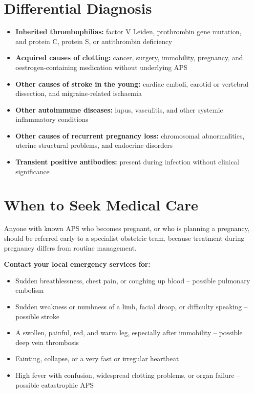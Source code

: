 \section*{Differential Diagnosis}
\begin{itemize}
    \item \textbf{Inherited thrombophilias:} factor V Leiden, prothrombin gene mutation, and protein C, protein S, or antithrombin deficiency
    \item \textbf{Acquired causes of clotting:} cancer, surgery, immobility, pregnancy, and oestrogen-containing medication without underlying APS
    \item \textbf{Other causes of stroke in the young:} cardiac emboli, carotid or vertebral dissection, and migraine-related ischaemia
    \item \textbf{Other autoimmune diseases:} lupus, vasculitis, and other systemic inflammatory conditions
    \item \textbf{Other causes of recurrent pregnancy loss:} chromosomal abnormalities, uterine structural problems, and endocrine disorders
    \item \textbf{Transient positive antibodies:} present during infection without clinical significance
\end{itemize}

\section*{When to Seek Medical Care}
Anyone with known APS who becomes pregnant, or who is planning a pregnancy, should be referred early to a specialist obstetric team, because treatment during pregnancy differs from routine management.

\textbf{Contact your local emergency services for:}
\begin{itemize}
    \item Sudden breathlessness, chest pain, or coughing up blood -- possible pulmonary embolism
    \item Sudden weakness or numbness of a limb, facial droop, or difficulty speaking -- possible stroke
    \item A swollen, painful, red, and warm leg, especially after immobility -- possible deep vein thrombosis
    \item Fainting, collapse, or a very fast or irregular heartbeat
    \item High fever with confusion, widespread clotting problems, or organ failure -- possible catastrophic APS
\end{itemize}

